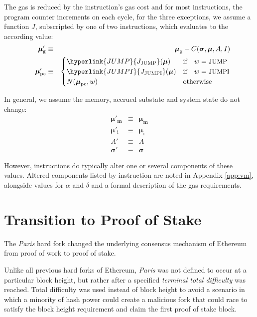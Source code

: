 \documentclass[9pt,oneside]{amsart}
\begin{document}
\begin{multicols}{2}
The gas is reduced by the instruction's gas cost and for most instructions, the program counter increments on each cycle, for the three exceptions, we assume a function $J$, subscripted by one of two instructions, which evaluates to the according value:
\begin{eqnarray}
\quad \boldsymbol{\mu}'_{\mathrm{g}} & \equiv & \boldsymbol{\mu}_{\mathrm{g}} - C(\boldsymbol{\sigma}, \boldsymbol{\mu}, A, I) \label{eq:mu_pc}\\
\quad \boldsymbol{\mu}'_{\mathrm{pc}} & \equiv & \begin{cases}
\hyperlink{JUMP}{J_{\text{JUMP}}}(\boldsymbol{\mu}) & \text{if} \quad w = \text{\small JUMP} \\
\hyperlink{JUMPI}{J_{\text{JUMPI}}}(\boldsymbol{\mu}) & \text{if} \quad w = \text{\small JUMPI} \\
N(\boldsymbol{\mu}_{\mathrm{pc}}, w) & \text{otherwise}
\end{cases}
\end{eqnarray}

In general, we assume the memory, accrued substate and system state do not change:
\begin{eqnarray}
\boldsymbol{\mu}'_{\mathbf{m}} & \equiv & \boldsymbol{\mu}_{\mathbf{m}} \\
\boldsymbol{\mu}'_{\mathrm{i}} & \equiv & \boldsymbol{\mu}_{\mathrm{i}} \\
A' & \equiv & A \\
\boldsymbol{\sigma}' & \equiv & \boldsymbol{\sigma}
\end{eqnarray}

However, instructions do typically alter one or several components of these values. Altered components listed by instruction are noted in Appendix \ref{app:vm}, alongside values for $\alpha$ and $\delta$ and a formal description of the gas requirements.

\section{Transition to Proof of Stake} \label{ch:pos_transition}
The \textit{Paris} hard fork changed the underlying consensus mechanism of Ethereum from proof of work to proof of stake.

Unlike all previous hard forks of Ethereum, \textit{Paris} was not defined to occur at a particular block height, but rather after a specified \textit{terminal total difficulty} was reached.
Total difficulty was used instead of block height to avoid a scenario in which a minority of hash power could create a malicious fork that could race to satisfy the block height requirement and claim the first proof of stake block.


\end{multicols}
\end{document}
